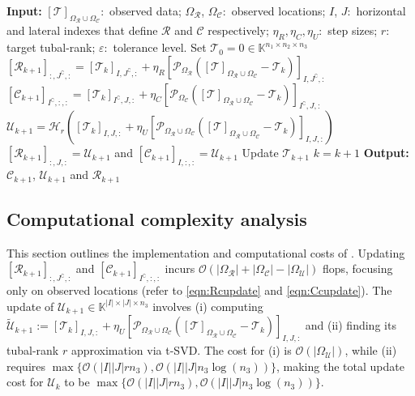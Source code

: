 \documentclass[twoside,12pt]{article}
\def\mcR{\mathcal{R}}
\def\mcC{\mathcal{C}}
\def\cO{\mathcal{O}}
\def\mcR{\mathcal{R}}
\def\mcC{\mathcal{C}}
\def\cO{\mathcal{O}}
\begin{document}
\begin{algorithm}[!th]
\caption{Iterative t-CUR Tensor Completion (ITCURTC) for t-CCS }\label{ticur}
\begin{algorithmic}[1]
\State \textbf{Input:} 
$[\mathcal{T}]_{\Omega_{\mcR}\cup \Omega_{\mcC}}:$ observed data;
$\Omega_\mathcal{R}$, $\Omega_\mathcal{C}:$ observed locations; $I$, $J:$ horizontal and lateral indexes that define $\mathcal{R}$ and $\mathcal{C}$ respectively; $\eta_{R}, \eta_{C}, \eta_{U}:$ step sizes; $r:$ target tubal-rank; $\varepsilon:$ tolerance level.
\State Set 
$\mathcal{T}_0 = 0 \in \mathbb{K}^{n_1\times n_2\times n_3}$
 
\State $[\mathcal{R}_{k+1}]_{:,J^{\complement},:} = [\mathcal{T}_k]_{I,J^{\complement},:} + \eta_{R} [\mathcal{P}_{\Omega_\mathcal{R}}([\mathcal{T}]_{\Omega_{\mcR}\cup \Omega_{\mcC}} -\mathcal{T}_k)]_{I,J^{\complement},:}$
\State $[\mathcal{C}_{k+1}]_{I^{\complement},:,:} = [\mathcal{T}_k]_{I^{\complement},J,:} + \eta_{C} [\mathcal{P}_{\Omega_\mathcal{C}}([\mathcal{T}]_{\Omega_{\mcR}\cup \Omega_{\mcC}} -\mathcal{T}_k)]_{I^{\complement}, J, :}$
\State $\mathcal{U}_{k+1} =  \mathcal{H}_{r}([\mathcal{T}_k]_{I,J,:} + \eta_{U}[\mathcal{P}_{\Omega_{\mathcal{R}}\cup \Omega_{\mathcal{C}}}([\mathcal{T}]_{\Omega_{\mcR}\cup \Omega_{\mcC}}-\mathcal{T}_k)]_{I,J,:})$
\State $[\mathcal{R}_{k+1}]_{:,J,:} = \mathcal{U}_{k+1}$ 
\quad and \quad  $[\mathcal{C}_{k+1}]_{I,:,:} = \mathcal{U}_{k+1}$
\State  Update $\mathcal{T}_{k+1}$
\State $k = k + 1$
\EndWhile
\State \textbf{Output:} $\mathcal{C}_{k+1}$, $\mathcal{U}_{k+1}$ and $\mathcal{R}_{k+1}$
\end{algorithmic}
\end{algorithm}
\subsection{Computational complexity analysis} \label{computational_cost}
This section outlines the implementation and computational costs of . Updating $[\mathcal{R}_{k+1}]_{:,J^{\complement},:}$ and $[\mathcal{C}_{k+1}]_{I^{\complement},:,:}$ incurs $\mathcal{O}\left(|\Omega_{\mcR}|+|\Omega_{\mcC}|-|\Omega_{\mathcal{U}}|\right)$ flops, focusing only on observed locations (refer to \eqref{eqn:Rcupdate} and \eqref{eqn:Ccupdate}). The update of $\mathcal{U}_{k+1}\in\mathbb{K}^{|I|\times|J|\times n_3}$ involves (i) computing $\widetilde{\mathcal{U}}_{k+1}:=[\mathcal{T}_k]_{I,J,:}+ \eta_{U}[\mathcal{P}_{\Omega_{\mathcal{R}}\cup \Omega_{\mathcal{C}}}([\mathcal{T}]_{\Omega_{\mcR}\cup \Omega_{\mcC}}-\mathcal{T}_k)]_{I,J,:}$ and (ii) finding its tubal-rank $r$ approximation via t-SVD. The cost for (i) is $\cO(|\Omega_{\mathcal{U}}|)$, while (ii) requires $\max\{\cO(|I||J|rn_3),\cO(|I||J|n_3\log(n_3))\}$, making the total update cost for $\mathcal{U}_k$ to be $\max\{\cO(|I||J|rn_3),\cO(|I||J|n_3\log(n_3))\}$. 
 
\end{document}
